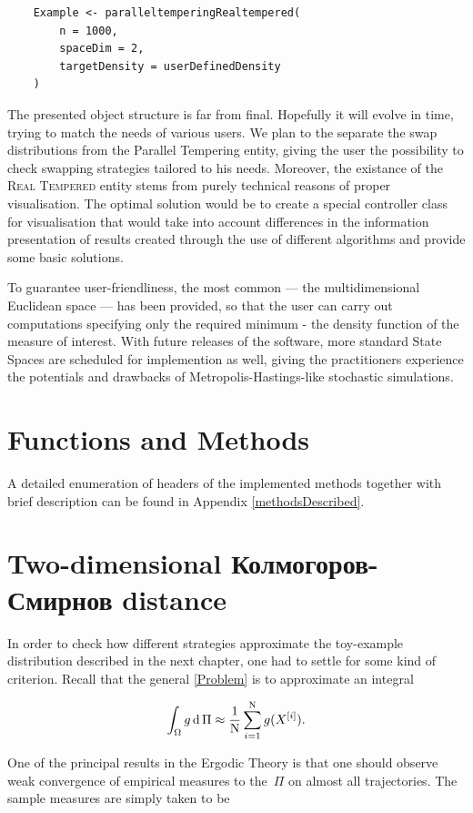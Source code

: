 \begin{lstlisting}
	Example <- paralleltemperingRealtempered(
		n = 1000,
		spaceDim = 2,
		targetDensity = userDefinedDensity
	)
\end{lstlisting}

The presented object structure is far from final. Hopefully it will evolve in time, trying to match the needs of various users. We plan to the separate the swap distributions from the Parallel Tempering entity, giving the user the possibility to check swapping strategies tailored to his needs. Moreover, the existance of the \textsc{Real Tempered} entity stems from purely technical reasons of proper visualisation. The optimal solution would be to create a special controller class for visualisation that would take into account differences in the information presentation of results created through the use of different algorithms and provide some basic solutions.

To guarantee user-friendliness, the most common \sspace --- the multidimensional Euclidean space --- has been provided, so that the user can carry out computations specifying only the required minimum - the density function of the measure of interest. With future releases of the software, more standard State Spaces are scheduled for implemention as well, giving the practitioners experience the potentials and drawbacks of Metropolis-Hastings-like stochastic simulations.

\section{Functions and Methods}

A detailed enumeration of headers of the implemented methods together with brief description can be found in Appendix \ref{methodsDescribed}.

\section{Two-dimensional Колмогоров-Смирнов distance}\label{KSimplementation}

In order to check how different strategies approximate the toy-example distribution described in the next chapter, one had to settle for some kind of criterion. Recall that the general \ref{Problem} is to approximate an integral

$$\int_\Omega g \,\mathrm{d }\,\Pi \approx \frac{1}{\mathrm{N}}\sum_{i = 1}^{\mathrm{N}} g(X^{[i]}). $$

One of the principal results in the Ergodic Theory is that one should observe weak convergence of empirical measures to the \measure\,$\Pi$ on almost all trajectories. The sample measures are simply taken to be

